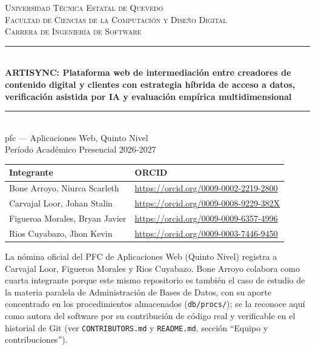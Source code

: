 
\begin{titlepage}
\centering

\textsc{\Large Universidad Técnica Estatal de Quevedo}\\[0.3cm]
\textsc{\large Facultad de Ciencias de la Computación y Diseño Digital}\\
\textsc{\large Carrera de Ingeniería de Software}\\[1.5cm]

\rule{\linewidth}{0.5mm}\\[0.4cm]
{\LARGE \bfseries ARTISYNC: Plataforma web de intermediación entre
creadores de contenido digital y clientes con estrategia híbrida de acceso
a datos, verificación asistida por IA y evaluación empírica
multidimensional}\\[0.4cm]
\rule{\linewidth}{0.5mm}\\[1cm]

{\large \gls{pfc} --- Aplicaciones Web, Quinto Nivel}\\
{\large Período Académico Presencial 2026-2027}\\[1.5cm]

\begin{minipage}{0.9\textwidth}
\centering
\begin{tabular}{@{}ll@{}}
\toprule
\textbf{Integrante} & \textbf{ORCID} \\
\midrule
Bone Arroyo, Niurca Scarleth & \url{https://orcid.org/0009-0002-2219-2800} \\
Carvajal Loor, Johan Stalin & \url{https://orcid.org/0009-0008-9229-382X} \\
Figueroa Morales, Bryan Javier & \url{https://orcid.org/0009-0009-6357-4996} \\
Rios Cuyabazo, Jhon Kevin & \url{https://orcid.org/0009-0003-7446-9450} \\
\bottomrule
\end{tabular}

\vspace{0.3cm}
\footnotesize{La nómina oficial del PFC de Aplicaciones Web (Quinto Nivel) registra a
Carvajal Loor, Figueroa Morales y Rios Cuyabazo. Bone Arroyo colabora como cuarta
integrante porque este mismo repositorio es también el caso de estudio de la materia
paralela de Administración de Bases de Datos, con su aporte concentrado en los
procedimientos almacenados (\texttt{db/procs/}); se la reconoce aquí como autora del
software por su contribución de código real y verificable en el historial de Git (ver
\texttt{CONTRIBUTORS.md} y \texttt{README.md}, sección ``Equipo y contribuciones'').}
\end{minipage}\\[1cm]


\end{titlepage}
